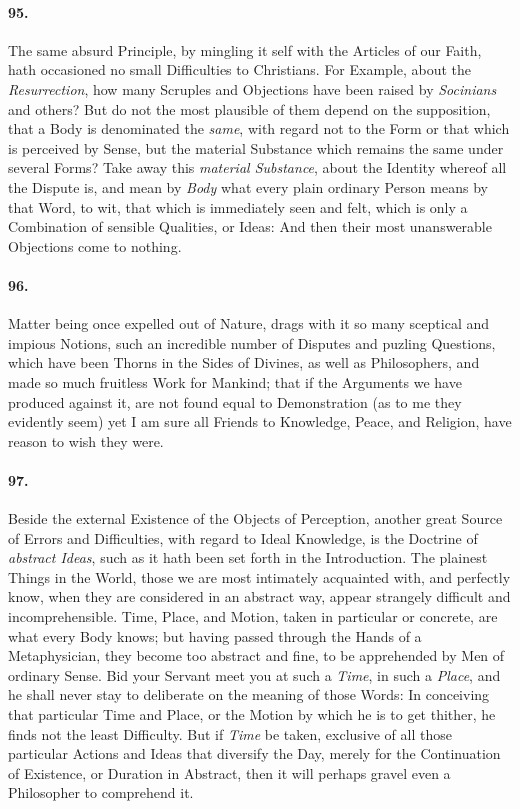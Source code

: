\documentclass[]{article}
\newenvironment{sectionbody}{\begin{multicols}{2}}{\end{multicols}}
\begin{document}
\begin{sectionbody}
\paragraph{95.} The same absurd Principle, by mingling it self with the Articles
of our Faith, hath occasioned no small Difficulties to
Christians.  For Example, about the \emph{Resurrection}, how
many Scruples and Objections have been raised by
\emph{Socinians} and others? But do not the most plausible of
them depend on the supposition, that a Body is denominated the
\emph{same}, with regard not to the Form or that which is
perceived by Sense, but the material Substance which remains the
same under several Forms?  Take away this \emph{material
Substance}, about the Identity whereof all the Dispute is,
and mean by \emph{Body} what every plain ordinary Person means
by that Word, to wit, that which is immediately seen and felt,
which is only a Combination of sensible Qualities, or Ideas: And
then their most unanswerable Objections come to nothing.



\paragraph{96.} Matter being once expelled out of Nature, drags with it so many
sceptical and impious Notions, such an incredible number of
Disputes and puzling Questions, which have been Thorns in the
Sides of Divines, as well as Philosophers, and made so much
fruitless Work for Mankind; that if the Arguments we have
produced against it, are not found equal to Demonstration (as to
me they evidently seem) yet I am sure all Friends to Knowledge,
Peace, and Religion, have reason to wish they were.



\paragraph{97.} Beside the external Existence of the Objects of Perception,
another great Source of Errors and Difficulties, with regard to
Ideal Knowledge, is the Doctrine of \emph{abstract Ideas}, such
as it hath been set forth in the Introduction.  The plainest
Things in the World, those we are most intimately acquainted
with, and perfectly know, when they are considered in an abstract
way, appear strangely difficult and incomprehensible.  Time,
Place, and Motion, taken in particular or concrete, are what
every Body knows; but having passed through the Hands of a
Metaphysician, they become too abstract and fine, to be
apprehended by Men of ordinary Sense.  Bid your Servant meet you
at such a \emph{Time}, in such a \emph{Place}, and he shall
never stay to deliberate on the meaning of those Words: In
conceiving that particular Time and Place, or the Motion by which
he is to get thither, he finds not the least Difficulty.  But if
\emph{Time} be taken, exclusive of all those particular Actions
and Ideas that diversify the Day, merely for the Continuation of
Existence, or Duration in Abstract, then it will perhaps gravel
even a Philosopher to comprehend it.




\end{sectionbody}
\end{document}

